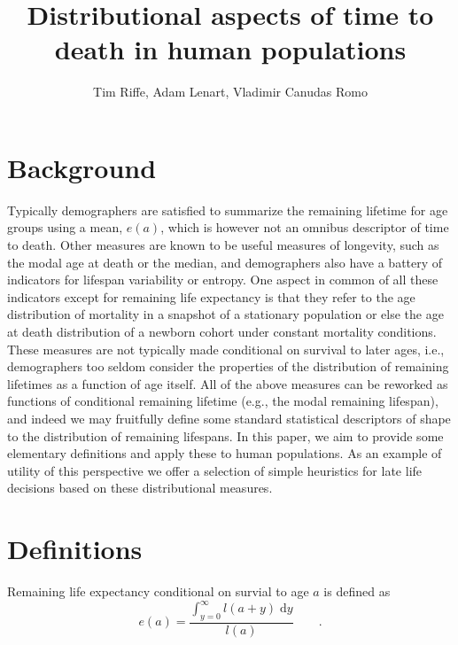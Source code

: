 \documentclass{article}
\newcommand{\dd}{\; \mathrm{d}}
\newcommand{\tp}{\quad\quad\text{.}}
\begin{document}
\title{Distributional aspects of time to death in human populations}
\author{Tim Riffe, Adam Lenart, Vladimir Canudas Romo}
\maketitle

\section{Background}

Typically demographers are satisfied to summarize the remaining lifetime for age
groups using a mean, $e(a)$, which is however not an omnibus descriptor of time
to death. Other measures are known to be useful measures of longevity, such as
the modal age at death or the median, and demographers also have a battery of
indicators for lifespan variability or entropy. One aspect in common of all
these indicators except for remaining life expectancy is that they refer to the
age distribution of mortality in a snapshot of a stationary population or else
the age at death distribution of a newborn cohort under constant mortality
conditions. These measures are not typically made conditional on survival to
later ages, i.e., demographers too seldom consider the properties of the
distribution of remaining lifetimes as a function of age itself. All of
the above measures can be reworked as functions of conditional remaining
lifetime (e.g., the modal remaining lifespan), and indeed we may fruitfully define some standard
statistical descriptors of shape to the distribution of remaining lifespans. In
this paper, we aim to provide some elementary definitions and apply these to
human populations. As an example of utility of this perspective we offer a
selection of simple heuristics for late life decisions based on these
distributional measures.

\section{Definitions}

Remaining life expectancy conditional on survial to age $a$ is defined as
\begin{equation}
e(a) = \frac{\int_{y=0}^\infty l(a+y) \dd y}{l(a)} \tp
\end{equation}
\end{document}
